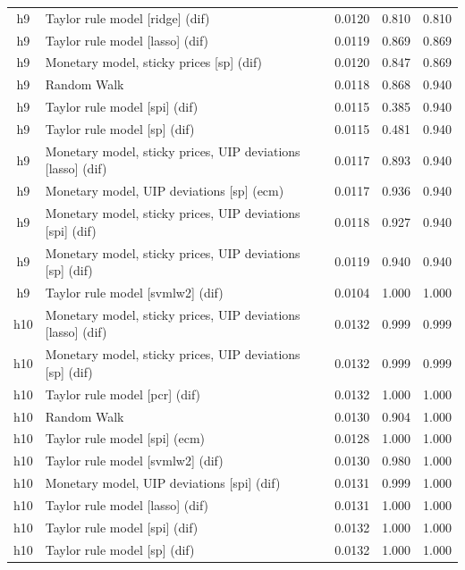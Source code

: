 \begin{ThreePartTable}
\begin{longtable}[t]{cp{5.5cm}ccc}
\addlinespace
h9 & \raggedright Taylor rule model [ridge] (dif) & 0.0120 & 0.810 & 0.810\\
h9 & \raggedright Taylor rule model [lasso] (dif) & 0.0119 & 0.869 & 0.869\\
h9 & \raggedright Monetary model, sticky prices [sp] (dif) & 0.0120 & 0.847 & 0.869\\
h9 & \raggedright Random Walk & 0.0118 & 0.868 & 0.940\\
h9 & \raggedright Taylor rule model [spi] (dif) & 0.0115 & 0.385 & 0.940\\
h9 & \raggedright Taylor rule model [sp] (dif) & 0.0115 & 0.481 & 0.940\\
h9 & \raggedright Monetary model, sticky prices, UIP deviations [lasso] (dif) & 0.0117 & 0.893 & 0.940\\
h9 & \raggedright Monetary model, UIP deviations [sp] (ecm) & 0.0117 & 0.936 & 0.940\\
h9 & \raggedright Monetary model, sticky prices, UIP deviations [spi] (dif) & 0.0118 & 0.927 & 0.940\\
h9 & \raggedright Monetary model, sticky prices, UIP deviations [sp] (dif) & 0.0119 & 0.940 & 0.940\\
h9 & \raggedright Taylor rule model [svmlw2] (dif) & 0.0104 & 1.000 & 1.000\\
\addlinespace
h10 & \raggedright Monetary model, sticky prices, UIP deviations [lasso] (dif) & 0.0132 & 0.999 & 0.999\\
h10 & \raggedright Monetary model, sticky prices, UIP deviations [sp] (dif) & 0.0132 & 0.999 & 0.999\\
h10 & \raggedright Taylor rule model [pcr] (dif) & 0.0132 & 1.000 & 1.000\\
h10 & \raggedright Random Walk & 0.0130 & 0.904 & 1.000\\
h10 & \raggedright Taylor rule model [spi] (ecm) & 0.0128 & 1.000 & 1.000\\
h10 & \raggedright Taylor rule model [svmlw2] (dif) & 0.0130 & 0.980 & 1.000\\
h10 & \raggedright Monetary model, UIP deviations [spi] (dif) & 0.0131 & 0.999 & 1.000\\
h10 & \raggedright Taylor rule model [lasso] (dif) & 0.0131 & 1.000 & 1.000\\
h10 & \raggedright Taylor rule model [spi] (dif) & 0.0132 & 1.000 & 1.000\\
h10 & \raggedright Taylor rule model [sp] (dif) & 0.0132 & 1.000 & 1.000\\

\end{longtable}
\end{ThreePartTable}
